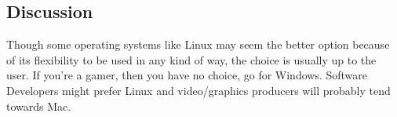 \documentclass{scrreprt}
\begin{document}
\subsection{Discussion}
Though some operating systems like Linux may seem the better option because of its flexibility to be
used in any kind of way, the choice is usually up to the user. If you’re a gamer, then you have no choice,
go for Windows. Software Developers might prefer Linux and video/graphics producers will probably
tend towards Mac.
\end{document}
